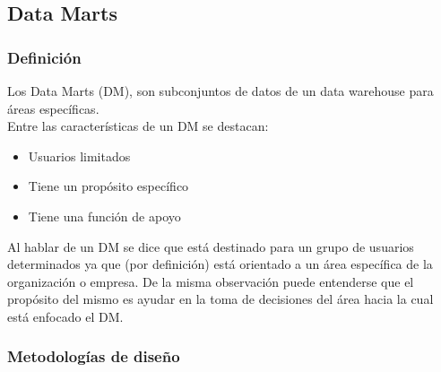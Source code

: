 \documentclass[a4paper,11pt]{article}
\begin{document}
\begin{flushleft}
    \subsection{Data Marts}
    
    \subsubsection{Definición}

    Los Data Marts (DM), son subconjuntos de datos de un data warehouse para áreas específicas.\\
    Entre las características de un DM se destacan:
    
    \begin{itemize}
      \item Usuarios limitados
      \item Tiene un propósito específico
      \item Tiene una función de apoyo
    \end{itemize}
    
    Al hablar de un DM se dice que está destinado para un grupo de usuarios determinados ya que (por definición) está orientado a un área específica de la
    organización o empresa. De la misma observación puede entenderse que el propósito del mismo es ayudar en la toma de decisiones del área hacia la cual
    está enfocado el DM.
    
    \subsubsection{Metodologías de diseño}
    

\end{flushleft}
\end{document}
